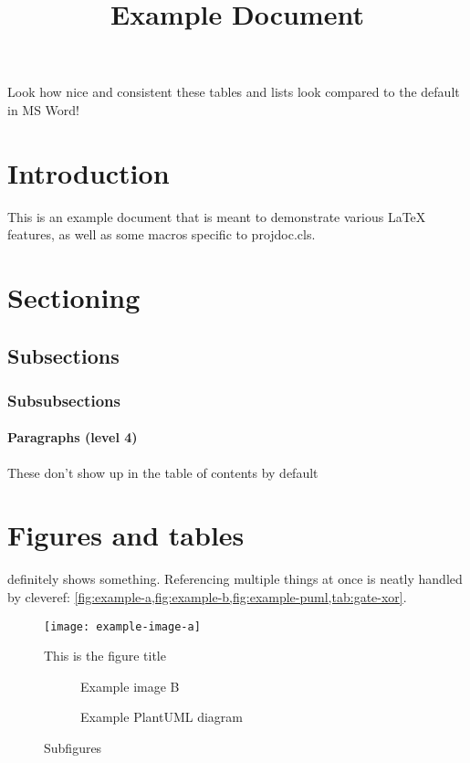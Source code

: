 \documentclass{projdoc}
\title{Example Document}
\begin{document}
\tablestables

\bigskip
Look how nice and consistent these tables and lists look compared to the default in
MS Word!

\newpage

\section{Introduction}

This is an example document that is meant to demonstrate various \LaTeX{} features,
as well as some macros specific to \hbox{projdoc.cls}.

\section{Sectioning}
\subsection{Subsections}
\subsubsection{Subsubsections}
\paragraph{Paragraphs (level 4)}

These don't show up in the table of contents by default

\section{Figures and tables}

 definitely shows something. Referencing multiple things at once
is neatly handled by cleveref:
\cref{fig:example-a,fig:example-b,fig:example-puml,tab:gate-xor}.

\begin{figure}
	\centering
	\texttt{[image: example-image-a]}
	\caption{This is the figure title}
	\label{fig:example-a} %
\end{figure}

\begin{figure}
	\begin{subfigure}{0.45\textwidth}%
		\centering
		\caption{Example image B}
		\label{fig:example-b}
	\end{subfigure}%
	\hfill
	\begin{subfigure}{0.45\textwidth}%
		\centering
		\caption{Example PlantUML diagram}
		\label{fig:example-puml}
	\end{subfigure}%
	\caption{Subfigures}
\end{figure}
\end{document}
